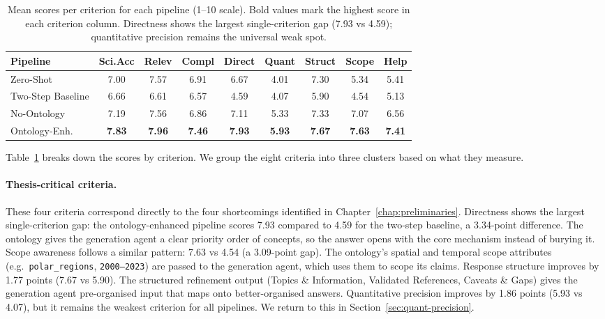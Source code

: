 \begin{table}[htbp]
\centering
\caption{Mean scores per criterion for each pipeline (1--10 scale).
Bold values mark the highest score in each criterion column. Directness
shows the largest single-criterion gap (7.93 vs 4.59); quantitative precision
remains the universal weak spot.}
\label{tab:per-criterion-means}
\small
\begin{tabular}{lcccccccc}
\toprule
\textbf{Pipeline} & \textbf{Sci.Acc} & \textbf{Relev} & \textbf{Compl}
& \textbf{Direct} & \textbf{Quant} & \textbf{Struct}
& \textbf{Scope} & \textbf{Help} \\
\midrule
Zero-Shot & 7.00 & 7.57 & 6.91 & 6.67 & 4.01 & 7.30 & 5.34 & 5.41 \\
Two-Step Baseline & 6.66 & 6.61 & 6.57 & 4.59 & 4.07 & 5.90 & 4.54 & 5.13 \\
No-Ontology & 7.19 & 7.56 & 6.86 & 7.11 & 5.33 & 7.33 & 7.07 & 6.56 \\
Ontology-Enh. & \textbf{7.83} & \textbf{7.96} & \textbf{7.46}
& \textbf{7.93} & \textbf{5.93} & \textbf{7.67}
& \textbf{7.63} & \textbf{7.41} \\
\bottomrule
\end{tabular}
\end{table}

Table~\ref{tab:per-criterion-means} breaks down the scores by criterion. We group the eight criteria into three clusters based on what they measure.

\paragraph{Thesis-critical criteria.} These four criteria correspond directly to the four shortcomings identified in Chapter~\ref{chap:preliminaries}. Directness shows the largest single-criterion gap: the ontology-enhanced pipeline scores 7.93 compared to 4.59 for the two-step baseline, a 3.34-point difference. The ontology gives the generation agent a clear priority order of concepts, so the answer opens with the core mechanism instead of burying it. Scope awareness follows a similar pattern: 7.63 vs 4.54 (a 3.09-point gap). The ontology's spatial and temporal scope attributes (e.g.\ \texttt{polar\_regions}, \texttt{2000--2023}) are passed to the generation agent, which uses them to scope its claims. Response structure improves by 1.77 points (7.67 vs 5.90). The structured refinement output (Topics \& Information, Validated References, Caveats \& Gaps) gives the generation agent pre-organised input that maps onto better-organised answers. Quantitative precision improves by 1.86 points (5.93 vs 4.07), but it remains the weakest criterion for all pipelines. We return to this in Section~\ref{sec:quant-precision}.

